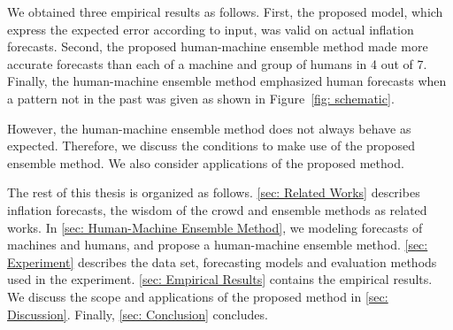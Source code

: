 \documentclass[../main.tex]{subfiles}
\begin{document}
We obtained three empirical results as follows.
First, the proposed model, which express the expected error according to input, was valid on actual inflation forecasts.
Second, the proposed human-machine ensemble method made more accurate forecasts than each of a machine and group of humans in 4 out of 7.
Finally, the human-machine ensemble method emphasized human forecasts when a pattern not in the past was given as shown in Figure~\ref{fig: schematic}.

However, the human-machine ensemble method does not always behave as expected.
Therefore, we discuss the conditions to make use of the proposed ensemble method.
We also consider applications of the proposed method.

The rest of this thesis is organized as follows.
\ref{sec: Related Works} describes inflation forecasts, the wisdom of the crowd and ensemble methods as related works.
In \ref{sec: Human-Machine Ensemble Method}, we modeling forecasts of machines and humans, and propose a human-machine ensemble method.
\ref{sec: Experiment} describes the data set, forecasting models and evaluation methods used in the experiment.
\ref{sec: Empirical Results} contains the empirical results.
We discuss the scope and applications of the proposed method in \ref{sec: Discussion}.
Finally, \ref{sec: Conclusion} concludes.
\end{document}

